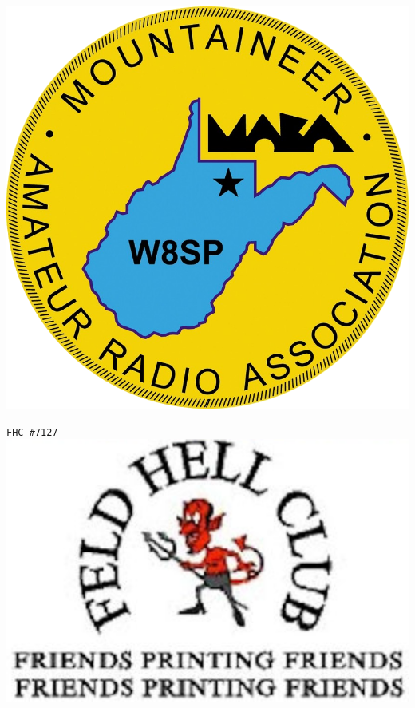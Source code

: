 \documentclass{article}
\begin{document}
\hspace{5pt}\begin{minipage}{0.2\textwidth} 
\includegraphics[scale=0.3]{w8sp.png}\end{minipage}\begin{minipage}{0.3\textwidth} 
\phantom{AB}\texttt{FHC {\#}7127}\\
\includegraphics[scale=0.15]{feldhellclub.png} 
\end{minipage}\begin{minipage}{0.3\textwidth}

\end{minipage}
\end{document}
